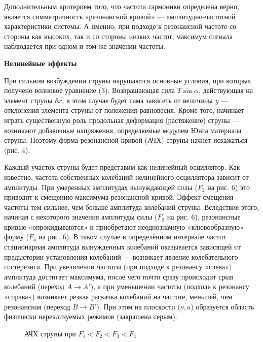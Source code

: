 \documentclass[14pt]{article}
\begin{document}
Дополнительным критерием того, что частота гармоники определена верно, является симметричность «резонансной кривой» — амплитудно-частотной характеристики системы. А именно, при подходе к резонансной частоте со стороны как высоких, так и со стороны низких частот, максимум сигнала наблюдается при одном и том же значении частоты.

\vspace{1cm}
\textbf{Нелинейные эффекты}

При сильном возбуждении струны нарушаются основные условия, при которых получено волновое уравнение (3). Возвращающая сила $T\sin\alpha$, действующая на элемент струны $\delta x$, в этом случае будет сама зависеть от величины $y$ --- отклонения элемента струны от положения равновесия. Кроме того, начинает играть существенную роль продольная деформация (растяжение) струны --- возникают добавочные напряжения, определяемые модулем Юнга материала струны. Поэтому форма резонансной кривой (АЧХ) струны начнет искажаться (рис. 4).

Каждый участок струны будет представим как нелинейный осциллятор. Как известно, частота собственных колебаний нелинейного осциллятора зависит от амплитуды. При умеренных амплитудах вынуждающей силы ($F_2$ на рис. 6) это приводит к смещению максимума резонансной кривой. Эффект смещения частоты тем сильнее, чем больше амплитуда колебаний струны. Вследствие этого, начиная с некоторого значения амплитуды силы ($F_3$ на рис. 6), резонансные кривые «опрокидываются» и приобретают неоднозначную «клювообразную» форму ($F_4$ на рис. 6). В таком случае в определённом интервале частот стационарная амплитуда вынужденных колебаний оказывается зависящей от предыстории установления колебаний --- возникает явление колебательного гистерезиса. При увеличении частоты (при подходе к резонансу «слева») амплитуда достигает максимума, после чего почти сразу происходит срыв колебаний (переход $A \rightarrow A'$), а при уменьшении частоты (подходе к резонансу «справа») возникает резкая раскачка колебаний на частоте, меньшей, чем резонансная (переход $B \rightarrow B'$). При этом на плоскости ($\nu, a$) образуется область физически нереализуемых режимов (закрашена серым).

\begin{figure}[h!]
	\caption{АЧХ струны при $F_1 < F_2 < F_3 < F_4$}
	\label{fig:image}
\end{figure}
\end{document}
